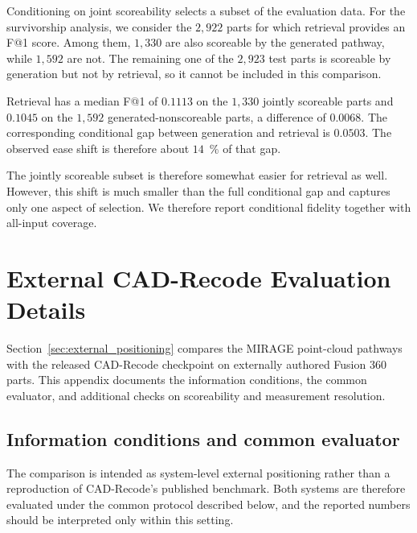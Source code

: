 \documentclass[preprint,12pt]{elsarticle}
\begin{document}
Conditioning on joint scoreability selects a subset of the evaluation data.
For the survivorship analysis, we consider the $2{,}922$ parts for which
retrieval provides an F@1 score. Among them, $1{,}330$ are also scoreable by
the generated pathway, while $1{,}592$ are not. The remaining one of the
$2{,}923$ test parts is scoreable by generation but not by retrieval, so it
cannot be included in this comparison.

Retrieval has a median F@1 of $0.1113$ on the $1{,}330$ jointly scoreable
parts and $0.1045$ on the $1{,}592$ generated-nonscoreable parts, a difference
of $0.0068$. The corresponding conditional gap between generation and
retrieval is $0.0503$. The observed ease shift is therefore about $14$~\% of
that gap.

The jointly scoreable subset is therefore somewhat easier for retrieval as
well. However, this shift is much smaller than the full conditional gap and
captures only one aspect of selection. We therefore report conditional
fidelity together with all-input coverage.


\section{External CAD-Recode Evaluation Details}
\label{app:external}

Section~\ref{sec:external_positioning} compares the MIRAGE point-cloud pathways with the released CAD-Recode checkpoint on externally authored Fusion 360 parts. This appendix documents the information conditions, the common evaluator, and additional checks on scoreability and measurement resolution.

\subsection{Information conditions and common evaluator}
\label{app:external_evaluator}

The comparison is intended as system-level external positioning rather than a
reproduction of CAD-Recode's published benchmark. Both systems are therefore
evaluated under the common protocol described below, and the reported numbers
should be interpreted only within this setting.
\end{document}
